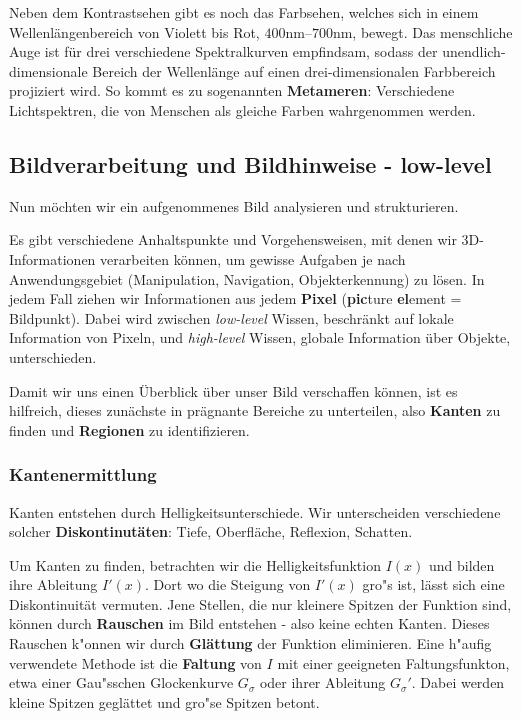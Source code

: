 Neben dem Kontrastsehen gibt es noch das Farbsehen, welches sich in einem Wellenlängenbereich von Violett bis Rot, $400$nm--$700$nm, bewegt. Das menschliche Auge ist für drei verschiedene Spektralkurven empfindsam, sodass der unendlich-dimensionale Bereich der Wellenlänge auf einen drei-dimensionalen Farbbereich projiziert wird. So kommt es zu sogenannten \textbf{Metameren}: Verschiedene Lichtspektren, die von Menschen als gleiche Farben wahrgenommen werden.

\subsection{Bildverarbeitung und Bildhinweise - \glqq low-level\grqq}

Nun möchten wir ein aufgenommenes Bild analysieren und strukturieren.

Es gibt verschiedene Anhaltspunkte und Vorgehensweisen, mit denen wir 3D-Informationen verarbeiten können, um gewisse Aufgaben je nach Anwendungsgebiet (Manipulation, Navigation, Objekterkennung) zu lösen. In jedem Fall ziehen wir Informationen aus jedem \textbf{Pixel} (\textbf{pic}ture \textbf{el}ement = Bildpunkt). Dabei wird zwischen \textit{low-level} Wissen, beschränkt auf lokale Information von Pixeln, und \textit{high-level} Wissen, globale Information über Objekte, unterschieden.

Damit wir uns einen Überblick über unser Bild verschaffen können, ist es hilfreich, dieses zunächste in prägnante Bereiche zu unterteilen, also \textbf{Kanten} zu finden und \textbf{Regionen} zu identifizieren.

\subsubsection{Kantenermittlung}

Kanten entstehen durch Helligkeitsunterschiede. Wir unterscheiden verschiedene solcher \textbf{Diskontinutäten}: Tiefe, Oberfläche, Reflexion, Schatten.

Um Kanten zu finden, betrachten wir die Helligkeitsfunktion $I(x)$ und bilden ihre Ableitung $I'(x)$.
Dort wo die Steigung von $I'(x)$ gro"s ist, lässt sich eine Diskontinuität vermuten.
Jene Stellen, die nur kleinere Spitzen der Funktion sind, können durch \textbf{Rauschen} im Bild entstehen - also keine echten Kanten.
Dieses Rauschen k"onnen wir durch \textbf{Glättung} der Funktion eliminieren. Eine h"aufig verwendete Methode ist die \textbf{Faltung} von $I$ mit einer geeigneten Faltungsfunkton, etwa einer Gau"sschen Glockenkurve $G_\sigma$ oder ihrer Ableitung $G_\sigma'$. Dabei werden kleine Spitzen geglättet und gro"se Spitzen betont.

